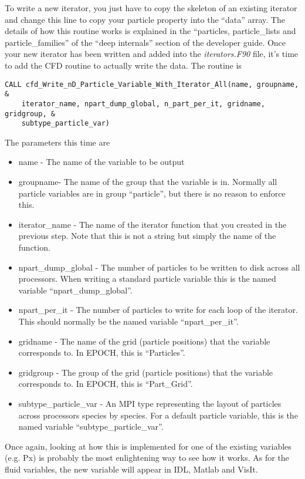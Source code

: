 \documentclass[12pt,a4paper]{article}
\newcommand{\simpleboxverbatim}{\begin{Verbatim}[obeytabs=true,frame=single,
  framerule=0.5mm,rulecolor=\color{warwickmid},formatcom=\color{black}]}
\newcommand{\EPOCH}{{\color{warwickdark}\fontfamily{phv}\selectfont{EPOCH}}}
\begin{document}
To write a new iterator, you just have to copy the skeleton of an existing
iterator and change this line to copy your particle property into the ``data''
array. The details of how this routine works is explained in the ``particles,
particle\_lists and particle\_families'' of the ``deep internals'' section of
the developer guide. Once your new iterator has been written and added into the
{\it iterators.F90} file, it's time to add the CFD routine to actually write
the data. The routine is
\simpleboxverbatim
CALL cfd_Write_nD_Particle_Variable_With_Iterator_All(name, groupname, &
    iterator_name, npart_dump_global, n_part_per_it, gridname, gridgroup, &
    subtype_particle_var)
\end{Verbatim}

The parameters this time are
\begin{itemize}
\item name - The name of the variable to be output
\item groupname- The name of the group that the variable is in. Normally all
  {\EPOCH} particle variables are in group ``particle'', but there is no reason
  to enforce this.
\item iterator\_name - The name of the iterator function that you created in
  the previous step. Note that this is not a string but simply the name of the
  function.
\item npart\_dump\_global - The number of particles to be written to disk
  across all processors. When writing a standard particle variable this is the
  named variable ``npart\_dump\_global''.
\item npart\_per\_it - The number of particles to write for each loop of the
  iterator. This should normally be the named variable ``npart\_per\_it''.
\item gridname - The name of the grid (particle positions) that the variable
  corresponds to. In EPOCH, this is ``Particles''.
\item gridgroup - The group of the grid (particle positions) that the variable
  corresponds to. In EPOCH, this is ``Part\_Grid''.
\item subtype\_particle\_var - An MPI type representing the layout of particles
  across processors species by species. For a default particle variable, this
  is the named variable ``subtype\_particle\_var''.
\end{itemize}

Once again, looking at how this is implemented for one of the existing
variables (e.g. Px) is probably the most enlightening way to see how it
works. As for the fluid variables, the new variable will appear in IDL, Matlab
and VisIt.
\end{document}
